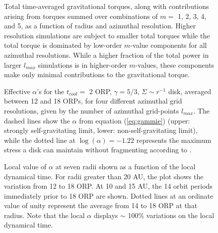 \documentclass[manuscript]{aastex}
\begin{document}
\begin{figure}
\caption
{
Total time-averaged gravitational  torques, along with contributions arising from torques
summed over combinations of  $m = $ 1, 2, 3, 4, and 5,
as a function of radius and azimuthal resolution. 
Higher resolution simulations are subject to smaller total torques while the total torque is dominated by low-order $m$-value
components for all azimuthal resolutions.  While a higher fraction of the total power in larger $l_{max}$ simulations is in higher-order $m$-values, these components make only minimal contributions to the gravitational torque. 
}
\label{fig:torquearray}
\end{figure}


\begin{figure}
\caption
{Effective $\alpha$'s for the $t_{cool} =$ 2 ORP, $\gamma = 5/3$, $\Sigma \sim r^{ -1}$ disk, averaged between 12 and 18
  ORPs, for four different azimuthal grid resolutions, given by the number of azimuthal grid-points $l_{max}$. The
  dashed lines show the $\alpha$ from equation (\ref{eq:gammie}) (upper: strongly self-gravitating limit, lower:
  non-self-gravitating limit), while the dotted line at $\log(\alpha) = -1.22$ represents the maximum stress a disk can
  maintain without fragmenting according to \citet{rice2005}. 
}
\label{fig:alpha_v_radius}
\end{figure}
\newpage

\begin{figure}
\caption{
Local value of $\alpha$ at seven radii shown as a function of the local dynamical time.  For radii greater than 20 AU, the plot shows 
the variation from 12 to 18 ORP.  At 10 and 15 AU, the 14 orbit periods immediately prior to 18 ORP are shown.
Dotted lines at an ordinate value of unity represent the average from 14 to 18 ORP at that radius.
Note that the local $\alpha$ displays $\sim$ 100\% variations on the local dynamical time. 
}
\label{fig:alphavar}
\end{figure}
\end{document}

